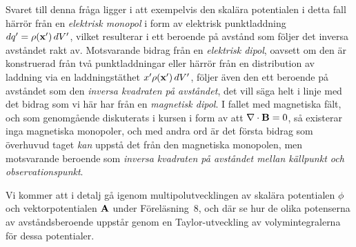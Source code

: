 {{{{{Svaret till denna fr{\aa}ga ligger i att exempelvis den skal{\"a}ra potentialen
i detta fall h{\"a}rr{\"o}r fr{\aa}n en {\it elektrisk monopol} i form av
elektrisk punktladdning $dq'=\rho({\bf x}')\,dV'$, vilket resulterar i ett
beroende p{\aa} avst{\aa}nd som f{\"o}ljer det inversa avst{\aa}ndet rakt av.
Motsvarande bidrag fr{\aa}n en {\it elektrisk dipol}, oavsett om den {\"a}r
konstruerad fr{\aa}n tv{\aa} punktladdningar eller h{\"a}rr{\"o}r fr{\aa}n en
distribution av laddning via en laddningst{\"a}thet $x'\rho({\bf x}')\,dV'$,
f{\"o}ljer {\"a}ven den ett beroende p{\aa} avst{\aa}ndet som den {\it inversa
kvadraten p{\aa} avst{\aa}ndet}, det vill s{\"a}ga helt i linje med det bidrag
som vi h{\"a}r har fr{\aa}n en {\it magnetisk dipol}.
I fallet med magnetiska f{\"a}lt, och som genomg{\aa}ende diskuterats i kursen
i form av att $\nabla\cdot{\bf B}=0$, s{\aa} existerar inga magnetiska
monopoler, och med andra ord {\"a}r det f{\"o}rsta bidrag som {\"o}verhuvud
taget {\it kan} uppst{\aa} det fr{\aa}n den magnetiska monopolen, men
motsvarande beroende som {\it inversa kvadraten p{\aa} avst{\aa}ndet mellan
k{\"a}llpunkt och observationspunkt}.

Vi kommer att i detalj g{\aa} igenom multipolutvecklingen av skal{\"a}ra
potentialen $\phi$ och vektorpotentialen ${\bf A}$ under F{\"o}rel{\"a}sning~8,
och d{\"a}r se hur de olika potenserna av avst{\aa}ndsberoende uppst{\aa}r
genom en Taylor-utveckling av volymintegralerna f{\"o}r dessa potentialer.
\vfill\eject

}}}}}
